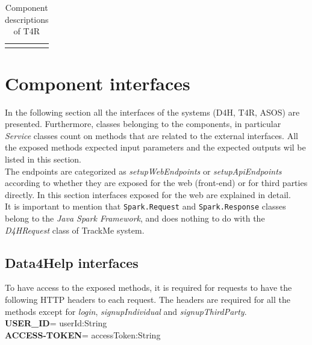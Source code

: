 \documentclass[a4paper, hidelinks, 12pt]{report}
\begin{document}
\begin{longtable}{l p{}}
			\hline
			\caption{Component descriptions of T4R}
			\label{table:t4r_component_descriptions}
		\end{longtable}
		
	\section{Component interfaces}
	In the following section all the interfaces of the systems (D4H, T4R, ASOS) are presented. Furthermore, classes belonging to the components, in particular \textit{Service} classes count on methods that are related to the external interfaces. All the  exposed methods expected input parameters and the expected outputs wil be listed in this section.  \\
	
	The endpoints are categorized as \textit{setupWebEndpoints} or \textit{setupApiEndpoints} according to whether they are exposed for the web (front-end) or for third parties directly.  In this section interfaces exposed for the web are explained in detail.\\
	
	It is important to mention that \verb|Spark.Request| and \verb|Spark.Response| classes belong to the \textit{Java Spark Framework}, and does nothing to do with the \textit{D4HRequest} class of TrackMe system. 
		
	\subsection{Data4Help interfaces}	
	To have access to the exposed methods, it is required for requests to have the following HTTP headers to each request. 	The headers are required for all the methods except for \textit{login},  \textit{signupIndividual} and \textit{signupThirdParty}.\\
	\textbf{USER\_ID}= userId:String \\
	\textbf{ACCESS-TOKEN}= accessToken:String \\
\end{document}
